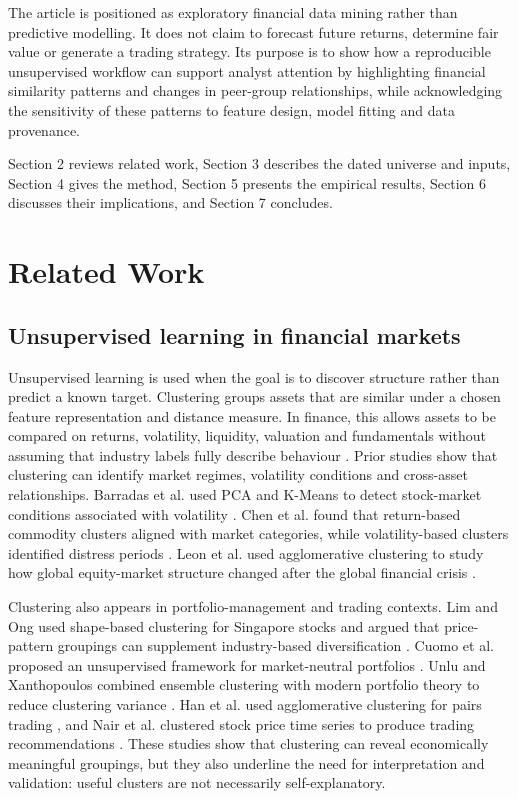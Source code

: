 The article is positioned as exploratory financial data mining rather than predictive modelling. It does not claim to forecast future returns, determine fair value or generate a trading strategy. Its purpose is to show how a reproducible unsupervised workflow can support analyst attention by highlighting financial similarity patterns and changes in peer-group relationships, while acknowledging the sensitivity of these patterns to feature design, model fitting and data provenance.


Section 2 reviews related work, Section 3 describes the dated universe and inputs, Section 4 gives the method, Section 5 presents the empirical results, Section 6 discusses their implications, and Section 7 concludes.


\FloatBarrier
\section{Related Work}

\subsection{Unsupervised learning in financial markets}

Unsupervised learning is used when the goal is to discover structure rather than predict a known target. Clustering groups assets that are similar under a chosen feature representation and distance measure. In finance, this allows assets to be compared on returns, volatility, liquidity, valuation and fundamentals without assuming that industry labels fully describe behaviour \citep{greene2008}. Prior studies show that clustering can identify market regimes, volatility conditions and cross-asset relationships. Barradas et al. used PCA and K-Means to detect stock-market conditions associated with volatility \citep{barradas2023}. Chen et al. found that return-based commodity clusters aligned with market categories, while volatility-based clusters identified distress periods \citep{chen2021}. Leon et al. used agglomerative clustering to study how global equity-market structure changed after the global financial crisis \citep{leon2017}.


Clustering also appears in portfolio-management and trading contexts. Lim and Ong used shape-based clustering for Singapore stocks and argued that price-pattern groupings can supplement industry-based diversification \citep{lim2021}. Cuomo et al. proposed an unsupervised framework for market-neutral portfolios \citep{cuomo2022}. Unlu and Xanthopoulos combined ensemble clustering with modern portfolio theory to reduce clustering variance \citep{unlu2021}. Han et al. used agglomerative clustering for pairs trading \citep{han2023}, and Nair et al. clustered stock price time series to produce trading recommendations \citep{nair2017}. These studies show that clustering can reveal economically meaningful groupings, but they also underline the need for interpretation and validation: useful clusters are not necessarily self-explanatory.


